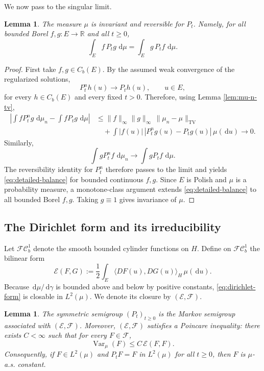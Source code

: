 \documentclass[12pt]{article}
\numberwithin{equation}{section}
\newtheorem{lemma}[theorem]{Lemma}
\newcommand{\dd}{\,\mathrm d}
\newcommand{\1}{\mathbf 1}
\newcommand{\R}{\mathbb R}
\newcommand{\cE}{\mathcal E}
\newcommand{\cF}{\mathcal F}
\newcommand{\Var}{\operatorname{Var}}
\begin{document}
We now pass to the singular limit.

\begin{lemma}\label{lem:limit-reversible}
The measure $\mu$ is invariant and reversible for $P_t$. Namely, for all bounded
Borel $f,g:E\to\R$ and all $t\geq0$,
\begin{equation}\label{eq:detailed-balance}
        \int_E f\,P_tg\,\dd\mu
        =
        \int_E g\,P_tf\,\dd\mu .
\end{equation}
\end{lemma}

\begin{proof}
First take $f,g\in C_b(E)$. By the assumed weak convergence of the regularized
solutions,
\[
        P_t^n h(u)\longrightarrow P_t h(u),\qquad u\in E,
\]
for every $h\in C_b(E)$ and every fixed $t>0$. Therefore, using Lemma
\ref{lem:mu-n-tv},
\[
\begin{aligned}
\left|\int fP_t^ng\,\dd\mu_n-\int fP_tg\,\dd\mu\right|
&\leq
\|f\|_\infty\|g\|_\infty\,\|\mu_n-\mu\|_{\mathrm{TV}}        \\
&\quad
+\int |f(u)|\,|P_t^ng(u)-P_tg(u)|\,\mu(\dd u)
\longrightarrow0.
\end{aligned}
\]
Similarly,
\[
        \int gP_t^nf\,\dd\mu_n\longrightarrow \int gP_tf\,\dd\mu .
\]
The reversibility identity for $P_t^n$ therefore passes to the limit and yields
\eqref{eq:detailed-balance} for bounded continuous $f,g$. Since $E$ is Polish and
$\mu$ is a probability measure, a monotone-class argument extends
\eqref{eq:detailed-balance} to all bounded Borel $f,g$. Taking $g\equiv1$ gives
invariance of $\mu$.
\end{proof}

\subsection{The Dirichlet form and its irreducibility}

Let $\mathcal{FC}_b^1$ denote the smooth bounded cylinder functions on $H$. Define
on $\mathcal{FC}_b^1$ the bilinear form
\begin{equation}\label{eq:dirichlet-form}
        \cE(F,G)
        :=
        \frac12\int_E \langle DF(u),DG(u)\rangle_H\,\mu(\dd u).
\end{equation}
Because $\dd\mu/\dd\gamma$ is bounded above and below by positive constants,
\eqref{eq:dirichlet-form} is closable in $L^2(\mu)$. We denote its closure by
$(\cE,\cF)$.

\begin{lemma}\label{lem:dirichlet-form}
The symmetric semigroup $(P_t)_{t\geq0}$ is the Markov semigroup associated with
$(\cE,\cF)$. Moreover, $(\cE,\cF)$ satisfies a Poincare inequality: there exists
$C<\infty$ such that for every $F\in\cF$,
\begin{equation}\label{eq:poincare}
        \Var_\mu(F)\leq C\,\cE(F,F).
\end{equation}
Consequently, if $F\in L^2(\mu)$ and $P_tF=F$ in $L^2(\mu)$ for all $t\geq0$, then
$F$ is $\mu$-a.s. constant.
\end{lemma}
\end{document}
